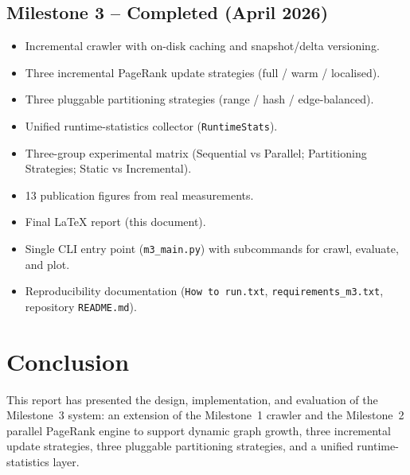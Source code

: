 \documentclass[11pt,a4paper]{article}
\begin{document}
\subsection{Milestone 3 -- Completed (April 2026)}
\begin{itemize}
    \item[\checkmark] Incremental crawler with on-disk caching and
    snapshot/delta versioning.
    \item[\checkmark] Three incremental PageRank update strategies
    (full / warm / localised).
    \item[\checkmark] Three pluggable partitioning strategies
    (range / hash / edge-balanced).
    \item[\checkmark] Unified runtime-statistics collector
    (\texttt{RuntimeStats}).
    \item[\checkmark] Three-group experimental matrix
    (Sequential vs Parallel; Partitioning Strategies; Static vs
    Incremental).
    \item[\checkmark] 13 publication figures from real measurements.
    \item[\checkmark] Final LaTeX report (this document).
    \item[\checkmark] Single CLI entry point (\texttt{m3\_main.py})
    with subcommands for crawl, evaluate, and plot.
    \item[\checkmark] Reproducibility documentation
    (\texttt{How to run.txt}, \texttt{requirements\_m3.txt},
    repository \texttt{README.md}).
\end{itemize}

\section{Conclusion}

This report has presented the design, implementation, and evaluation of
the Milestone~3 system: an extension of the Milestone~1 crawler and
the Milestone~2 parallel PageRank engine to support dynamic graph
growth, three incremental update strategies, three pluggable
partitioning strategies, and a unified runtime-statistics layer.
\end{document}

